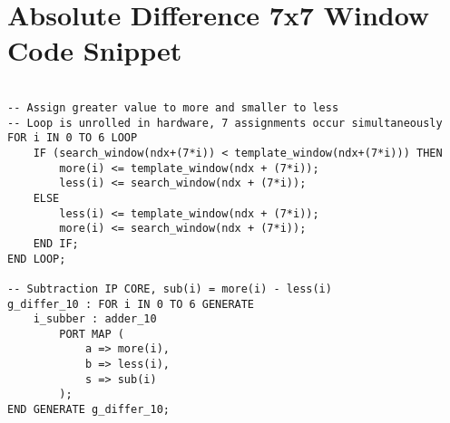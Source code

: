 \chapter{Absolute Difference 7x7 Window Code Snippet}
\label{sec:appdxB}



\begin{lstlisting}

-- Assign greater value to more and smaller to less
-- Loop is unrolled in hardware, 7 assignments occur simultaneously
FOR i IN 0 TO 6 LOOP
	IF (search_window(ndx+(7*i)) < template_window(ndx+(7*i))) THEN 
		more(i) <= template_window(ndx + (7*i));
		less(i) <= search_window(ndx + (7*i));
	ELSE
		less(i) <= template_window(ndx + (7*i));
		more(i) <= search_window(ndx + (7*i));
	END IF;
END LOOP;

-- Subtraction IP CORE, sub(i) = more(i) - less(i)
g_differ_10 : FOR i IN 0 TO 6 GENERATE
	i_subber : adder_10
		PORT MAP (
			a => more(i),
			b => less(i),
			s => sub(i)
		);
END GENERATE g_differ_10;

\end{lstlisting}